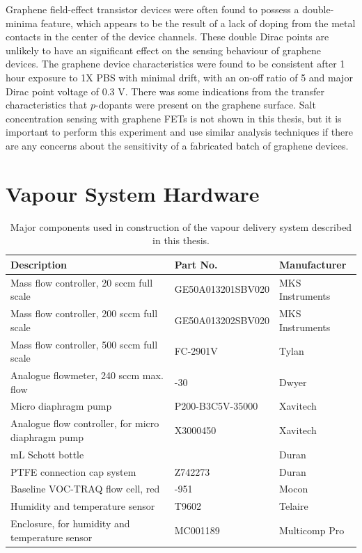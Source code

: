\documentclass[
  a4paper,
]{scrbook}
\begin{document}
Graphene field-effect transistor devices were often found to possess a
double-minima feature, which appears to be the result of a lack of
doping from the metal contacts in the center of the device channels.
These double Dirac points are unlikely to have an significant effect on
the sensing behaviour of graphene devices. The graphene device
characteristics were found to be consistent after 1 hour exposure to 1X
PBS with minimal drift, with an on-off ratio of 5 and major Dirac point
voltage of 0.3 V. There was some indications from the transfer
characteristics that \(p\)-dopants were present on the graphene surface.
Salt concentration sensing with graphene FETs is not shown in this
thesis, but it is important to perform this experiment and use similar
analysis techniques if there are any concerns about the sensitivity of a
fabricated batch of graphene devices.

\cleardoublepage
{}
{}
\appendix

\hypertarget{sec-vapour-sensor-components}{%
\chapter{Vapour System Hardware}\label{sec-vapour-sensor-components}}

\hypertarget{tbl-vapour-sensor-components}{}
\begin{longtable}[t]{>{\raggedright\arraybackslash}p{5.5cm}>{\raggedright\arraybackslash}p{4.5cm}>{\raggedright\arraybackslash}p{3.75cm}}
\caption{\label{tbl-vapour-sensor-components}Major components used in construction of the vapour delivery system
described in this thesis. }\tabularnewline

\toprule
Description & Part No. & Manufacturer\\
\midrule
Mass flow controller, 20 sccm full scale & GE50A013201SBV020 & MKS Instruments\\
Mass flow controller, 200 sccm full scale & GE50A013202SBV020 & MKS Instruments\\
Mass flow controller, 500 sccm full scale & FC-2901V & Tylan\\
Analogue flowmeter, 240 sccm max. flow & 116261-30 & Dwyer\\
Micro diaphragm pump & P200-B3C5V-35000 & Xavitech\\
\addlinespace
Analogue flow controller, for micro diaphragm pump & X3000450 & Xavitech\\
10 mL Schott bottle & 218010802 & Duran\\
PTFE connection cap system & Z742273 & Duran\\
Baseline VOC-TRAQ flow cell, red & 043-951 & Mocon\\
Humidity and temperature sensor & T9602 & Telaire\\
\addlinespace
Enclosure, for humidity and temperature sensor & MC001189 & Multicomp Pro\\
\bottomrule
\end{longtable}
\end{document}
